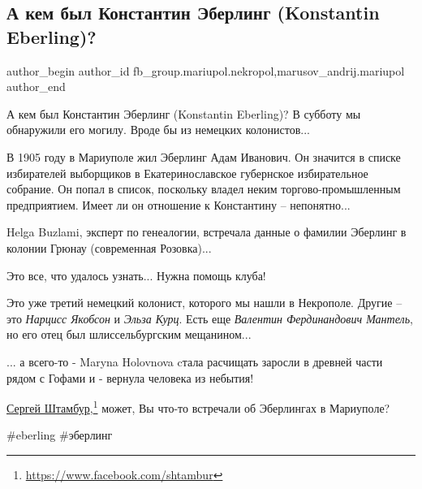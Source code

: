  
 
 
 
 

\subsection{А кем был Константин Эберлинг (Konstantin Eberling)?}
\label{sec:26_10_2020.fb.fb_group.mariupol.nekropol.1.kem_byl_konstantin_eberling}
 
\ifcmt
 author_begin
   author_id fb_group.mariupol.nekropol,marusov_andrij.mariupol
 author_end
\fi

А кем был Константин Эберлинг (Konstantin Eberling)? В субботу мы обнаружили
его могилу. Вроде бы из немецких колонистов...


В 1905 году в Мариуполе жил Эберлинг Адам Иванович. Он значится в списке
избирателей выборщиков в Екатеринославское губернское избирательное собрание.
Он попал в список, поскольку владел неким торгово-промышленным предприятием.
Имеет ли он отношение к Константину – непонятно...

Helga Buzlami, эксперт по генеалогии, встречала данные о фамилии Эберлинг в
колонии Грюнау (современная Розовка)...

Это все, что удалось узнать... Нужна помощь клуба! 🙂

Это уже третий немецкий колонист, которого мы нашли в Некрополе. Другие – это
\emph{Нарцисс Якобсон} и \emph{Эльза Курц}. Есть еще \emph{Валентин Фердинандович Мантель}, но его
отец был шлиссельбургским мещанином...

... а всего-то - Maryna Holovnova cтала расчищать заросли в древней части рядом с
Гофами и - вернула человека из небытия!

\href{https://www.facebook.com/shtambur}{Сергей Штамбур},\footnote{\url{https://www.facebook.com/shtambur}} может, Вы что-то встречали об Эберлингах в Мариуполе?

\#eberling \#эберлинг

